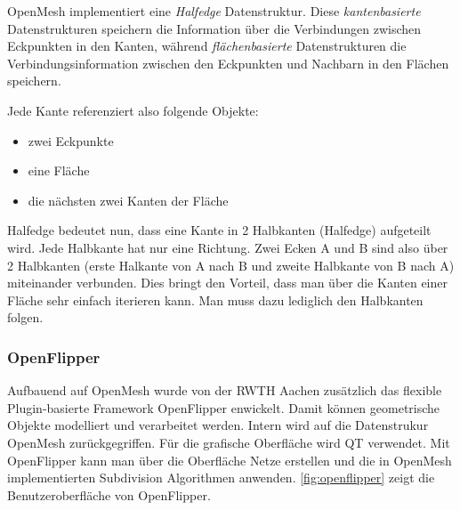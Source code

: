 OpenMesh implementiert eine \emph{Halfedge} Datenstruktur.
Diese \emph{kantenbasierte} Datenstrukturen speichern die Information über die Verbindungen zwischen Eckpunkten in den Kanten, während
\emph{flächenbasierte} Datenstrukturen die Verbindungsinformation zwischen den Eckpunkten und Nachbarn in den Flächen speichern.

Jede Kante referenziert also folgende Objekte:

\begin{itemize}
	\item zwei Eckpunkte
	\item eine Fläche
	\item die nächsten zwei Kanten der Fläche
\end{itemize}

Halfedge bedeutet nun, dass eine Kante in 2 Halbkanten (Halfedge) aufgeteilt wird. 
Jede Halbkante hat nur eine Richtung.
Zwei Ecken A und B sind also über 2 Halbkanten (erste Halkante von A nach B und zweite Halbkante von B nach A) miteinander verbunden.
Dies bringt den Vorteil, dass man über die Kanten einer Fläche sehr einfach iterieren kann. Man muss dazu lediglich den Halbkanten folgen.


\subsubsection{OpenFlipper}

Aufbauend auf OpenMesh wurde von der \ac{RWTH} Aachen zusätzlich das flexible Plugin-basierte Framework OpenFlipper enwickelt.
Damit können geometrische Objekte modelliert und verarbeitet werden. Intern wird auf die Datenstrukur OpenMesh zurückgegriffen.
Für die grafische Oberfläche wird QT verwendet.
Mit OpenFlipper kann man über die Oberfläche Netze erstellen und die in OpenMesh implementierten Subdivision Algorithmen anwenden.
\autoref{fig:openflipper} zeigt die Benutzeroberfläche von OpenFlipper.

